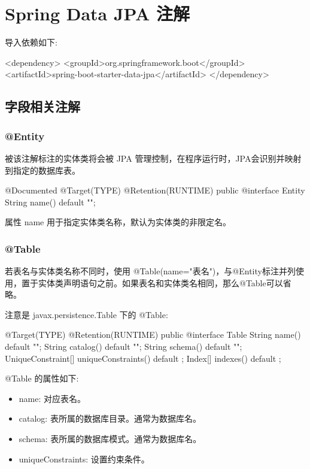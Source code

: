 \section{Spring Data JPA 注解}

导入依赖如下:

\begin{Java}
<dependency>
    <groupId>org.springframework.boot</groupId>
    <artifactId>spring-boot-starter-data-jpa</artifactId>
</dependency>
\end{Java}

\subsection{字段相关注解}

\subsubsection{@Entity}

被该注解标注的实体类将会被 JPA 管理控制，在程序运行时，JPA会识别并映射到指定的数据库表。

\begin{Java}
@Documented
@Target(TYPE)
@Retention(RUNTIME)
public @interface Entity {
	String name() default "";
}
\end{Java}

属性 name 用于指定实体类名称，默认为实体类的非限定名。

\subsubsection{@Table}

若表名与实体类名称不同时，使用 @Table(name="表名")，与@Entity标注并列使用，置于实体类声明语句之前。如果表名和实体类名相同，那么@Table可以省略。

注意是 javax.persistence.Table 下的 @Table:

\begin{Java}
@Target(TYPE) 
@Retention(RUNTIME)
public @interface Table {
    String name() default "";
    String catalog() default "";
    String schema() default "";
    UniqueConstraint[] uniqueConstraints() default {};
    Index[] indexes() default {};
}
\end{Java}

@Table 的属性如下:
\begin{itemize}
    \item name: 对应表名。
    \item catalog: 表所属的数据库目录。通常为数据库名。
    \item schema: 表所属的数据库模式。通常为数据库名。
    \item uniqueConstraints: 设置约束条件。
\end{itemize}

